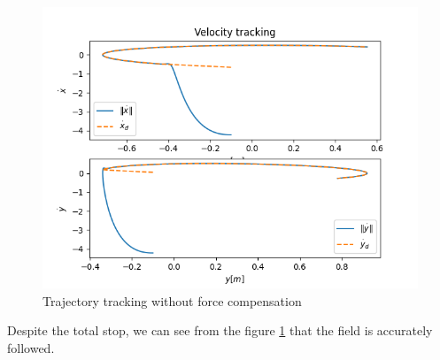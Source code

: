 \begin{figure}[h!]
   \centering
   \includegraphics[width=\linewidth]{Images/velocitytrackingpythonnocomp.png}
   \caption{Trajectory tracking without force compensation }
   \label{fig:trajtracknocomp}
\end{figure}

Despite the total stop, we can see from the figure \ref{fig:trajtracknocomp} that the field is accurately followed.
